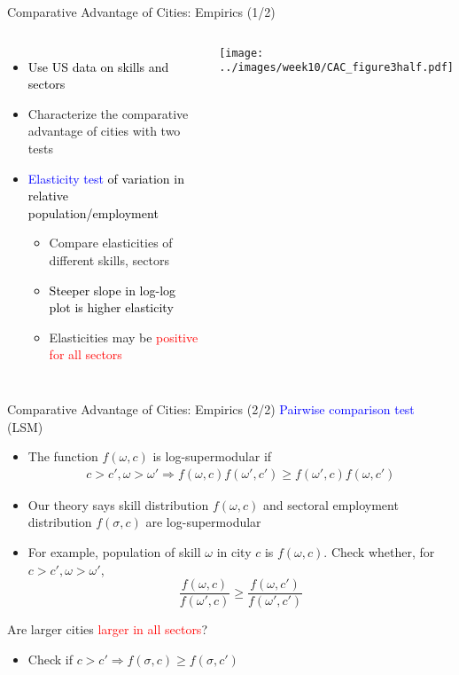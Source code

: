 \documentclass[10pt,notes=hide]{beamer}
\begin{document}
\begin{frame}{Comparative Advantage of Cities: Empirics (1/2)}
\begin{columns}
\begin{itemize}
\item \textcolor{black}{Use US data on skills and sectors}
\item Characterize the comparative advantage of cities with two tests
\item \textcolor{blue}{Elasticity test }\textcolor{black}{of variation in
relative population/employment}
\begin{itemize}
\item Compare elasticities of different skills, sectors
\item \textcolor{black}{Steeper slope in log-log plot is higher elasticity}
\item Elasticities may be \textcolor{red}{positive for all sectors}
\end{itemize}
\end{itemize}
\texttt{[image: ../images/week10/CAC\_figure3half.pdf]}
\end{columns}
\end{frame}
\begin{frame}{Comparative Advantage of Cities: Empirics (2/2)}
\textcolor{blue}{Pairwise comparison test} (LSM)
\begin{itemize}
\item The function $f(\omega,c)$ is log-supermodular if 
\begin{align*}
c>c',\omega>\omega'\Rightarrow f(\omega,c)f(\omega',c')\geq f(\omega',c)f(\omega,c')
\end{align*}
\item Our theory says skill distribution $f(\omega,c)$ and sectoral employment
distribution $f(\sigma,c)$ are log-supermodular 
\item For example, population of skill $\omega$ in city $c$ is $f(\omega,c)$.
Check whether, for $c>c',\omega>\omega'$,
\[
\frac{f(\omega,c)}{f(\omega',c)}\geq\frac{f(\omega,c')}{f(\omega',c')}
\]
\end{itemize}
Are larger cities \textcolor{red}{larger in all sectors}?
\begin{itemize}
\item Check if $c>c'\Rightarrow f(\sigma,c)\geq f(\sigma,c')$ 
\end{itemize}
\end{frame}
\end{document}
